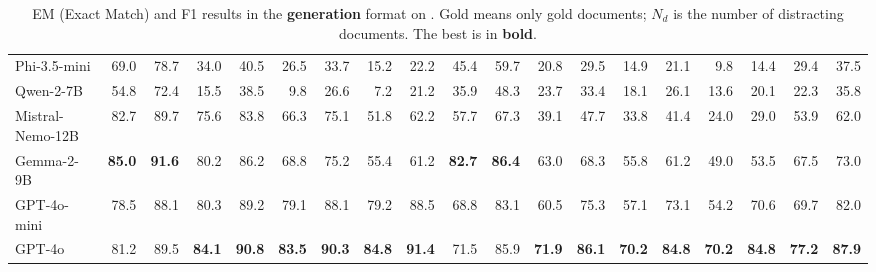 \begin{table}[!ht]
{\begin{tabular}{l|rr|rr|rr|rr|rr|rr|rr|rr|rr}
        Phi-3.5-mini & 69.0  & 78.7  & 34.0  & 40.5  & 26.5  & 33.7  & 15.2  & 22.2  & 45.4  & 59.7  & 20.8  & 29.5  & 14.9  & 21.1  & 9.8   & 14.4  & 29.4  & 37.5 \\
        Qwen-2-7B & 54.8  & 72.4  & 15.5  & 38.5  & 9.8   & 26.6  & 7.2   & 21.2  & 35.9  & 48.3  & 23.7  & 33.4  & 18.1  & 26.1  & 13.6  & 20.1  & 22.3  & 35.8 \\
        Mistral-Nemo-12B & 82.7  & 89.7  & 75.6  & 83.8  & 66.3  & 75.1  & 51.8  & 62.2  & 57.7  & 67.3  & 39.1  & 47.7  & 33.8  & 41.4  & 24.0  & 29.0  & 53.9  & 62.0 \\
        Gemma-2-9B & \textbf{85.0} & \textbf{91.6} & 80.2  & 86.2  & 68.8  & 75.2  & 55.4  & 61.2  & \textbf{82.7} & \textbf{86.4} & 63.0  & 68.3  & 55.8  & 61.2  & 49.0  & 53.5  & 67.5  & 73.0 \\
        GPT-4o-mini & 78.5  & 88.1  & 80.3  & 89.2  & 79.1  & 88.1  & 79.2  & 88.5  & 68.8  & 83.1  & 60.5  & 75.3  & 57.1  & 73.1  & 54.2  & 70.6  & 69.7  & 82.0 \\
        GPT-4o & 81.2  & 89.5  & \textbf{84.1} & \textbf{90.8} & \textbf{83.5} & \textbf{90.3} & \textbf{84.8} & \textbf{91.4} & 71.5  & 85.9  & \textbf{71.9} & \textbf{86.1} & \textbf{70.2} & \textbf{84.8} & \textbf{70.2} & \textbf{84.8} & \textbf{77.2} & \textbf{87.9} \\
        \bottomrule
        \end{tabular}%
    }
    \caption{
        EM (Exact Match) and F1 results in the \textbf{generation} format on \benchname.
        Gold means only gold documents; $N_{d}$ is the number of distracting documents.
        The best is in \textbf{bold}.
    }
    \label{tab_main_gen}
\end{table}

